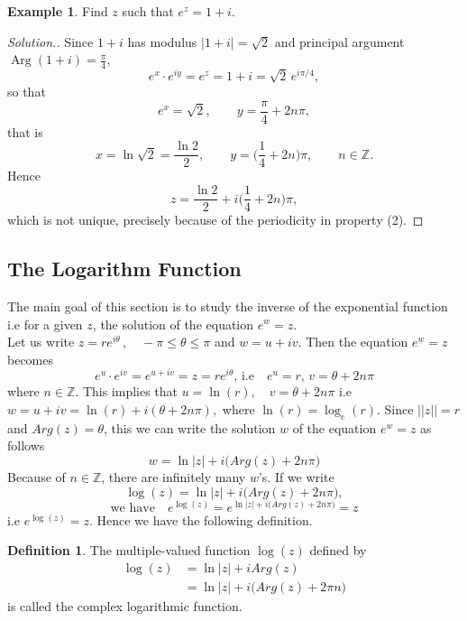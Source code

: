 \documentclass[11pt,a4paper]{article}
\theoremstyle{definition}
\newtheorem{definition}[thm]{Definition}
\newtheorem{example}[thm]{Example}
\newenvironment{solution}
  {\renewcommand{\qedsymbol}{}\begin{proof}[\textit{Solution}.]}
  {\end{proof}}
\begin{document}
\begin{example}
Find $z$ such that $e^z = 1 + i$.
\end{example}

\begin{solution}
Since $1+i$ has modulus $\left|1+i\right| = \sqrt{2}$ and principal argument
$\operatorname{Arg}(1+i) = \frac{\pi}{4}$,
$$e^x \cdot e^{iy} = e^z = 1 + i = \sqrt{2}\, e^{i\pi/4},$$
so that
$$e^x = \sqrt{2},\qquad y = \frac{\pi}{4} + 2n\pi ,$$
that is
$$x = \ln \sqrt{2} = \frac{\ln 2}{2},\qquad
y = \Big(\frac{1}{4} + 2n\Big)\pi ,\qquad n\in\mathbb{Z}.$$
Hence
$$z = \frac{\ln 2}{2} + i\Big(\frac{1}{4}+ 2n\Big)\pi ,$$
which is not unique, precisely because of the periodicity in property (2).
\end{solution}










{\color[wave]{485}\subsection{The Logarithm Function}}
The main goal of this section is to study the inverse of the exponential function i.e for a given $z$, the solution of the equation $e^w = z$.\\

Let us write $z = r e^{i\theta} \,,\quad  -\pi \leq \theta \leq \pi$ and $w = u + iv$. Then the equation $e^w = z$ becomes
$$e^u\cdot e^{iv} = e^{u + iv} = z = r e^{i\theta},\,\text{i.e}\quad  e^u = r, \, v  = \theta+ 2n\pi$$
where $n\in \mathbb{Z}$. This implies that $u = \ln (r), \quad  v = \theta + 2n\pi$ i.e $w = u + iv = \ln (r) + i(\theta + 2n\pi),$ where $\ln (r) = \log_e(r)$. Since $||z|| = r$ and $Arg(z)= \theta$, this we can write the solution $w$ of the equation $e^w = z$ as follows
$$w = \ln \left|z\right| + i \big(Arg(z) + 2n\pi\big)$$
Because of $n\in \mathbb{Z}$, there are infinitely many $w$'s. If we write
$$\log (z) = \ln \left|z\right| + i \big(Arg(z) + 2n\pi\big),$$
$$\text{we have}\quad  e^{\log (z)} = e^{\ln |z| + i\big(Arg(z) + 2n\pi\big)} = z$$
i.e $e^{\log (z) } = z$. Hence we have the following definition.\\



\begin{definition}
The multiple-valued function $\log (z)$ defined by 
\begin{align*}
\log (z) & = \ln \left|z\right|  + i Arg(z)\\
& = \ln \left|z\right| + i\big(Arg(z) + 2\pi n\big)
\end{align*}
is called the complex logarithmic function.
\end{definition}
\end{document}

